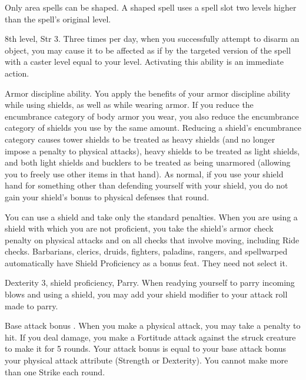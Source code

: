 Only area spells can be shaped. A shaped spell uses a spell slot two levels higher than the spell's original level.

\featpre 8th level, Str 3.
\featben Three times per day, when you successfully attempt to disarm an object, you may cause it to be affected as if by the targeted version of the  spell with a caster level equal to your level. Activating this ability is an immediate action.

\featpre Armor discipline ability.
\featben You apply the benefits of your armor discipline ability while using shields, as well as while wearing armor. If you reduce the encumbrance category of body armor you wear, you also reduce the encumbrance category of shields you use by the same amount. Reducing a shield's encumbrance category causes tower shields to be treated as heavy shields (and no longer impose a  penalty to physical attacks), heavy shields to be treated as light shields, and both light shields and bucklers to be treated as being unarmored (allowing you to freely use other items in that hand). As normal, if you use your shield hand for something other than defending yourself with your shield, you do not gain your shield's bonus to physical defenses that round.

 You can use a shield and take only the standard penalties.
 When you are using a shield with which you are not proficient, you take the shield's armor check penalty on physical attacks and on all checks that involve moving, including Ride checks.
 Barbarians, clerics, druids, fighters, paladins, rangers, and spellwarped automatically have Shield Proficiency as a bonus feat. They need not select it.

\featpres Dexterity 3, shield proficiency, Parry.
\featben When readying yourself to parry incoming blows and using a shield, you may add your shield modifier to your attack roll made to parry.

\featpre Base attack bonus .
\featben When you make a physical attack, you may take a  penalty to hit. If you deal damage, you make a Fortitude attack against the struck creature to make it \sickened for 5 rounds. Your attack bonus is equal to your base attack bonus \add your physical attack attribute (Strength or Dexterity). You cannot make more than one Strike each round.

